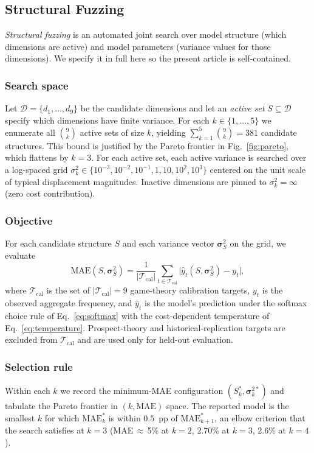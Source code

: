 \documentclass[journal]{IEEEtran}
\begin{document}
\subsection{Structural Fuzzing}
\label{sec:fuzzing}

\emph{Structural fuzzing} is an automated joint search over model structure (which dimensions are active) and model parameters (variance values for those dimensions).
We specify it in full here so the present article is self-contained.

\subsubsection{Search space}
Let $\mathcal{D}=\{d_1,\dots,d_9\}$ be the candidate dimensions and let an \emph{active set} $S\subseteq\mathcal{D}$ specify which dimensions have finite variance.
For each $k\in\{1,\dots,5\}$ we enumerate all $\binom{9}{k}$ active sets of size $k$, yielding $\sum_{k=1}^{5}\binom{9}{k}=381$ candidate structures.
This bound is justified by the Pareto frontier in Fig.~\ref{fig:pareto}, which flattens by $k=3$.
For each active set, each active variance is searched over a log-spaced grid $\sigma_k^2\in\{10^{-3},10^{-2},10^{-1},1,10,10^2,10^3\}$ centered on the unit scale of typical displacement magnitudes.
Inactive dimensions are pinned to $\sigma_k^2=\infty$ (zero cost contribution).

\subsubsection{Objective}
For each candidate structure $S$ and each variance vector $\boldsymbol{\sigma}_S^2$ on the grid, we evaluate
\begin{equation}
    \text{MAE}(S,\boldsymbol{\sigma}_S^2)
    = \frac{1}{|\mathcal{T}_{\text{cal}}|}
      \sum_{t\in\mathcal{T}_{\text{cal}}}
      \bigl|\hat{y}_t(S,\boldsymbol{\sigma}_S^2) - y_t\bigr|,
    \label{eq:fuzz-objective}
\end{equation}
where $\mathcal{T}_{\text{cal}}$ is the set of $|\mathcal{T}_{\text{cal}}|=9$ game-theory calibration targets, $y_t$ is the observed aggregate frequency, and $\hat{y}_t$ is the model's prediction under the softmax choice rule of Eq.~\eqref{eq:softmax} with the cost-dependent temperature of Eq.~\eqref{eq:temperature}.
Prospect-theory and historical-replication targets are excluded from $\mathcal{T}_{\text{cal}}$ and are used only for held-out evaluation.

\subsubsection{Selection rule}
Within each $k$ we record the minimum-MAE configuration $(S_k^*,\boldsymbol{\sigma}_k^{2*})$ and tabulate the Pareto frontier in $(k,\text{MAE})$ space.
The reported model is the smallest $k$ for which $\text{MAE}_k^*$ is within $0.5$~pp of $\text{MAE}_{k+1}^*$, an elbow criterion that the search satisfies at $k=3$ (MAE\,$\approx$\,5\% at $k=2$, 2.70\% at $k=3$, 2.6\% at $k=4$).
\end{document}
